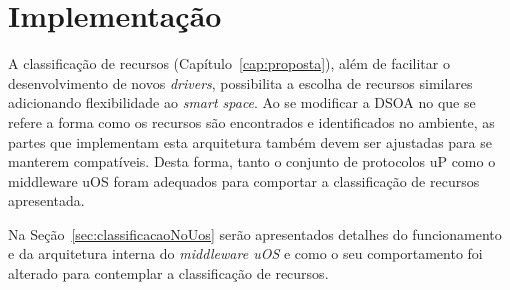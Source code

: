 \chapter{Implementação}

A classificação de recursos (Capítulo~\ref{cap:proposta}), além de facilitar o desenvolvimento de novos \emph{drivers}, possibilita a escolha de recursos similares adicionando flexibilidade ao \emph{smart space}. Ao se modificar a DSOA no que se refere a forma como os recursos são encontrados e identificados no ambiente, as partes que implementam esta arquitetura também devem ser ajustadas para se manterem compatíveis. Desta forma, tanto o conjunto de protocolos uP como o middleware uOS foram adequados para comportar a classificação de recursos apresentada.

Na Seção~\ref{sec:classificacaoNoUos} serão apresentados detalhes do funcionamento e da arquitetura interna do \emph{middleware uOS} e como o seu comportamento foi alterado para contemplar a classificação de recursos.


